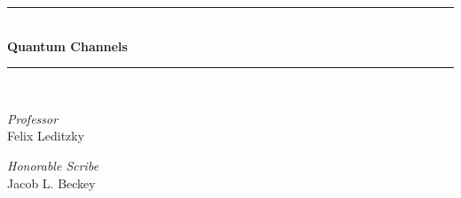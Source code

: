 \begin{titlepage} %
	\newcommand{\HRule}{\rule{\linewidth}{0.5mm}} %
	
	\center %
	

	
	
	\HRule\\[.7cm]
	{\huge\bfseries Quantum Channels}\\[0.3cm] %
	\HRule\\[.7cm]
	
	\vfill
	\begin{minipage}{\textwidth}
		\begin{center}
			\large
			\textit{Professor}\\
			Felix Leditzky %
		\end{center}
	\end{minipage}
	\vfill
	
	\vfill
	\begin{minipage}{\textwidth}
		\begin{center}
			\large
			\textit{Honorable Scribe}\\
			Jacob L. Beckey %
		\end{center}
	\end{minipage}
	\vfill
	
	
	

\end{titlepage}

